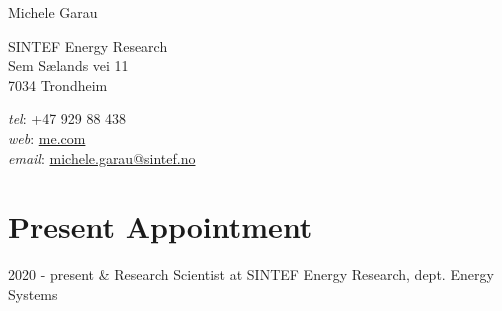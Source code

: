 \documentclass[11pt]{article}
\makeatletter
\newcommand{\myname}{Michele Garau}     %
\newcommand{\websiteurl}{{https://github.com/btskinner/tex_cv}} %
\newcommand{\websitename}{me.com}       %
\newcommand{\phone}{+47 929 88 438}       %
\newcommand{\email}{michele.garau@sintef.no}  %
\newcommand{\address}{                  %
  SINTEF Energy Research \\                    %
  Sem Sælands vei 11 \\                       %
  7034 Trondheim                        %
}
\makeatother
\begin{document}
\thispagestyle{first}


%

\hspace*{-\parindent}%
\begin{center}
  \vspace{-2em}
  {\Huge \myname} \\
\end{center}
\begin{minipage}[t]{.6\linewidth}
\address
\end{minipage}
\hspace*{-\parindent}%
\begin{minipage}[t]{.43\linewidth}
\begin{flushright}
  \textit{tel}: \phone \\
  \textit{web}: \href{\websiteurl}{\websitename} \\
  \textit{email}: \href{mailto:\email}{\email}
\end{flushright}
\end{minipage}
\begin{center}
  \vspace{-.5em}
  \doublerule
\end{center}



\section*{Present Appointment}
\begin{tabularx}{\linewidth}{\twocols}
  2020 - present & Research Scientist at SINTEF Energy Research, dept. Energy Systems \\
\end{tabularx}
\end{document}

